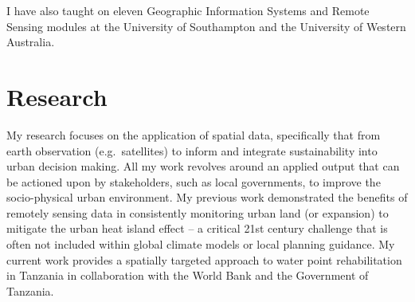 \documentclass[11pt,a4paper,]{moderncv}
\begin{document}
\nopagebreak

I have also taught on eleven Geographic Information Systems and Remote
Sensing modules at the University of Southampton and the University of
Western Australia.

\section{Research}\label{research}

My research focuses on the application of spatial data, specifically
that from earth observation (e.g.~satellites) to inform and integrate
sustainability into urban decision making. All my work revolves around
an applied output that can be actioned upon by stakeholders, such as
local governments, to improve the socio-physical urban environment. My
previous work demonstrated the benefits of remotely sensing data in
consistently monitoring urban land (or expansion) to mitigate the urban
heat island effect -- a critical 21st century challenge that is often
not included within global climate models or local planning guidance. My
current work provides a spatially targeted approach to water point
rehabilitation in Tanzania in collaboration with the World Bank and the
Government of Tanzania.
\end{document}
